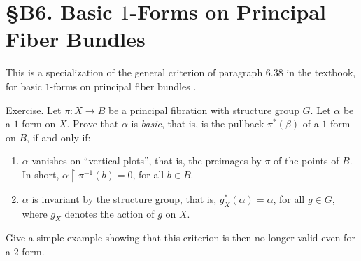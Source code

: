 
\chapter*{\S B6. Basic $1$-Forms on Principal Fiber Bundles}
\setcounter{footnote}{0}


\vspace{-1ex}\begin{abstract} %
  We give a criterion for basic $1$-forms on general principal bundles.
\end{abstract}


\vspace{-1ex}This is a specialization of the general criterion of paragraph 6.38 in the textbook, %
for basic $1$-forms on principal fiber bundles \cite[\textsection\,8.11]{PIZ13}.

\begin{Article}{Exercise.}{}
  Let $\pi : X \to B$ be a principal fibration with structure group $G$.
  Let $\alpha$ be a $1$-form on $X$.
  Prove that $\alpha$ is {\em basic},
  that is, is the pullback $\pi^*(\beta)$ of a $1$-form
  on $B$,
  if and only if:
  \begin{enumerate}
    \item $\alpha$  vanishes on ``vertical plots'', that is, the preimages
    by $\pi$ of the points of $B$.
    In short, $\alpha \restriction \pi^{-1}(b) = 0$,
    for all $b \in B$.
    \item $\alpha$  is invariant by the structure group,
    that is,
    $g_X^*(\alpha) = \alpha$,
    for all $g \in G$,
    where $g_X$ denotes the action of $g$ on $X$.
  \end{enumerate}
  Give a simple example showing that this criterion is then no longer valid even for a
  $2$-form.
\end{Article}

